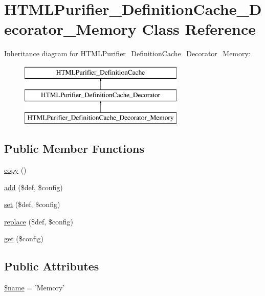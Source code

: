 \hypertarget{classHTMLPurifier__DefinitionCache__Decorator__Memory}{\section{H\+T\+M\+L\+Purifier\+\_\+\+Definition\+Cache\+\_\+\+Decorator\+\_\+\+Memory Class Reference}
\label{classHTMLPurifier__DefinitionCache__Decorator__Memory}
}
Inheritance diagram for H\+T\+M\+L\+Purifier\+\_\+\+Definition\+Cache\+\_\+\+Decorator\+\_\+\+Memory\+:\begin{figure}[H]
\begin{center}
\leavevmode
\includegraphics[height=3.000000cm]{classHTMLPurifier__DefinitionCache__Decorator__Memory}
\end{center}
\end{figure}
\subsection*{Public Member Functions}
\begin{DoxyCompactItemize}
\item 
\hyperlink{classHTMLPurifier__DefinitionCache__Decorator__Memory_a5ac4268e2b1a7e6d8170b978438e51c0}{copy} ()
\item 
\hyperlink{classHTMLPurifier__DefinitionCache__Decorator__Memory_aa68f14abc9ddaff8a47456765e472319}{add} (\$def, \$config)
\item 
\hyperlink{classHTMLPurifier__DefinitionCache__Decorator__Memory_aae502971eea6290aa156673d43ea3680}{set} (\$def, \$config)
\item 
\hyperlink{classHTMLPurifier__DefinitionCache__Decorator__Memory_a6313940e5c27d9b23dd19989af5a8ca3}{replace} (\$def, \$config)
\item 
\hyperlink{classHTMLPurifier__DefinitionCache__Decorator__Memory_a3c69231ee65e601c302636ad741e1173}{get} (\$config)
\end{DoxyCompactItemize}
\subsection*{Public Attributes}
\begin{DoxyCompactItemize}
\item 
\hyperlink{classHTMLPurifier__DefinitionCache__Decorator__Memory_aaa583537f97f1890c13803cdbc97474f}{\$name} = 'Memory'
\end{DoxyCompactItemize}
